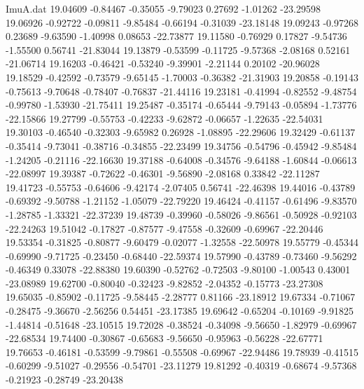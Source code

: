 \begin{filecontents}{ImuA.dat}
  19.04609   -0.84467   -0.35055   -9.79023    0.27692   -1.01262  -23.29598
  19.06926   -0.92722   -0.09811   -9.85484   -0.66194   -0.31039  -23.18148
  19.09243   -0.97268    0.23689   -9.63590   -1.40998    0.08653  -22.73877
  19.11580   -0.76929    0.17827   -9.54736   -1.55500    0.56741  -21.83044
  19.13879   -0.53599   -0.11725   -9.57368   -2.08168    0.52161  -21.06714
  19.16203   -0.46421   -0.53240   -9.39901   -2.21144    0.20102  -20.96028
  19.18529   -0.42592   -0.73579   -9.65145   -1.70003   -0.36382  -21.31903
  19.20858   -0.19143   -0.75613   -9.70648   -0.78407   -0.76837  -21.44116
  19.23181   -0.41994   -0.82552   -9.48754   -0.99780   -1.53930  -21.75411
  19.25487   -0.35174   -0.65444   -9.79143   -0.05894   -1.73776  -22.15866
  19.27799   -0.55753   -0.42233   -9.62872   -0.06657   -1.22635  -22.54031
  19.30103   -0.46540   -0.32303   -9.65982    0.26928   -1.08895  -22.29606
  19.32429   -0.61137   -0.35414   -9.73041   -0.38716   -0.34855  -22.23499
  19.34756   -0.54796   -0.45942   -9.85484   -1.24205   -0.21116  -22.16630
  19.37188   -0.64008   -0.34576   -9.64188   -1.60844   -0.06613  -22.08997
  19.39387   -0.72622   -0.46301   -9.56890   -2.08168    0.33842  -22.11287
  19.41723   -0.55753   -0.64606   -9.42174   -2.07405    0.56741  -22.46398
  19.44016   -0.43789   -0.69392   -9.50788   -1.21152   -1.05079  -22.79220
  19.46424   -0.41157   -0.61496   -9.83570   -1.28785   -1.33321  -22.37239
  19.48739   -0.39960   -0.58026   -9.86561   -0.50928   -0.92103  -22.24263
  19.51042   -0.17827   -0.87577   -9.47558   -0.32609   -0.69967  -22.20446
  19.53354   -0.31825   -0.80877   -9.60479   -0.02077   -1.32558  -22.50978
  19.55779   -0.45344   -0.69990   -9.71725   -0.23450   -0.68440  -22.59374
  19.57990   -0.43789   -0.73460   -9.56292   -0.46349    0.33078  -22.88380
  19.60390   -0.52762   -0.72503   -9.80100   -1.00543    0.43001  -23.08989
  19.62700   -0.80040   -0.32423   -9.82852   -2.04352   -0.15773  -23.27308
  19.65035   -0.85902   -0.11725   -9.58445   -2.28777    0.81166  -23.18912
  19.67334   -0.71067   -0.28475   -9.36670   -2.56256    0.54451  -23.17385
  19.69642   -0.65204   -0.10169   -9.91825   -1.44814   -0.51648  -23.10515
  19.72028   -0.38524   -0.34098   -9.56650   -1.82979   -0.69967  -22.68534
  19.74400   -0.30867   -0.65683   -9.56650   -0.95963   -0.56228  -22.67771
  19.76653   -0.46181   -0.53599   -9.79861   -0.55508   -0.69967  -22.94486
  19.78939   -0.41515   -0.60299   -9.51027   -0.29556   -0.54701  -23.11279
  19.81292   -0.40319   -0.68674   -9.57368   -0.21923   -0.28749  -23.20438

\end{filecontents}
